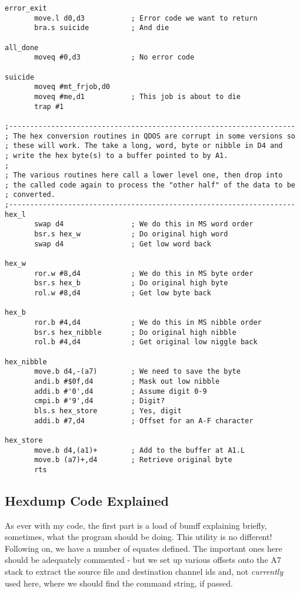 \begin{lstlisting}[firstnumber=1,caption={Hexdump Utility}]
error_exit
       move.l d0,d3           ; Error code we want to return
       bra.s suicide          ; And die

all_done
       moveq #0,d3            ; No error code

suicide
       moveq #mt_frjob,d0
       moveq #me,d1           ; This job is about to die
       trap #1

;--------------------------------------------------------------------
; The hex conversion routines in QDOS are corrupt in some versions so
; these will work. The take a long, word, byte or nibble in D4 and
; write the hex byte(s) to a buffer pointed to by A1.
;
; The various routines here call a lower level one, then drop into
; the called code again to process the "other half" of the data to be
; converted.
;--------------------------------------------------------------------
hex_l
       swap d4                ; We do this in MS word order
       bsr.s hex_w            ; Do original high word
       swap d4                ; Get low word back

hex_w
       ror.w #8,d4            ; We do this in MS byte order
       bsr.s hex_b            ; Do original high byte
       rol.w #8,d4            ; Get low byte back

hex_b
       ror.b #4,d4            ; We do this in MS nibble order
       bsr.s hex_nibble       ; Do original high nibble
       rol.b #4,d4            ; Get original low niggle back

hex_nibble
       move.b d4,-(a7)        ; We need to save the byte
       andi.b #$0f,d4         ; Mask out low nibble
       addi.b #'0',d4         ; Assume digit 0-9
       cmpi.b #'9',d4         ; Digit?
       bls.s hex_store        ; Yes, digit
       addi.b #7,d4           ; Offset for an A-F character

hex_store
       move.b d4,(a1)+        ; Add to the buffer at A1.L
       move.b (a7)+,d4        ; Retrieve original byte
       rts
\end{lstlisting}

\subsection{Hexdump Code Explained}

As ever with my code, the first part is a load of bumff explaining briefly, sometimes, what the program should be doing. This utility is no different! Following on, we have a number of equates defined. The important ones here should be adequately commented - but we set up various offsets onto the A7 stack to extract the source file and destination channel ids and, not \emph{currently} used here, where we should find the command string, if passed.

